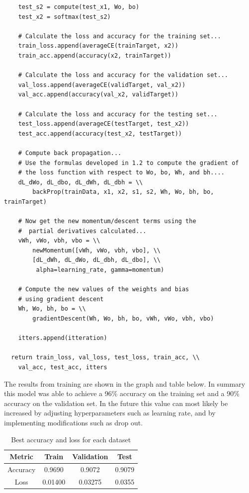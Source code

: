 \documentclass[12pt]{article}
\begin{document}
\begin{verbatim}
    test_s2 = compute(test_x1, Wo, bo)
    test_x2 = softmax(test_s2)

    # Calculate the loss and accuracy for the training set...
    train_loss.append(averageCE(trainTarget, x2))
    train_acc.append(accuracy(x2, trainTarget))

    # Calculate the loss and accuracy for the validation set...
    val_loss.append(averageCE(validTarget, val_x2))
    val_acc.append(accuracy(val_x2, validTarget))

    # Calculate the loss and accuracy for the testing set...
    test_loss.append(averageCE(testTarget, test_x2))
    test_acc.append(accuracy(test_x2, testTarget))

    # Compute back propagation...
    # Use the formulas developed in 1.2 to compute the gradient of 
    # the loss function with respect to Wo, bo, Wh, and bh....
    dL_dWo, dL_dbo, dL_dWh, dL_dbh = \\
        backProp(trainData, x1, x2, s1, s2, Wh, Wo, bh, bo, trainTarget)

    # Now get the new momentum/descent terms using the 
    #  partial derivatives calculated...
    vWh, vWo, vbh, vbo = \\
        newMomentum([vWh, vWo, vbh, vbo], \\
        [dL_dWh, dL_dWo, dL_dbh, dL_dbo], \\
         alpha=learning_rate, gamma=momentum)

    # Compute the new values of the weights and bias 
    # using gradient descent
    Wh, Wo, bh, bo = \\
        gradientDescent(Wh, Wo, bh, bo, vWh, vWo, vbh, vbo)

    itters.append(itteration)

  return train_loss, val_loss, test_loss, train_acc, \\
    val_acc, test_acc, itters
\end{verbatim}

The results from training are shown in the graph and table below. In summary
this model was able to achieve a 96\% accuracy on the training set and a 90\% 
accuracy on the validation set. In the future this value can most likely be increased by adjusting
hyperparameters such as learning rate, and by implementing modifications such as drop out.
\begin{center}
  \begin{table}[h]
    \centering
    \begin{tabular}{||c c c c||}
      \hline
      Metric   & Train   & Validation & Test   \\
      \hline\hline
      Accuracy & 0.9690  & 0.9072     & 0.9079 \\
      \hline
      Loss     & 0.01400 & 0.03275    & 0.0355 \\
      \hline
    \end{tabular}
    \caption{\label{tab: table-name}Best accuracy and loss for each dataset}
  \end{table}
\end{center}
\end{document}
